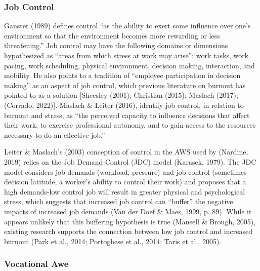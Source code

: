 \documentclass[
  twocolumn]{article}
\begin{document}
\subsubsection{Job Control}\label{job-control}

Ganster (1989) defines control ``as the ability to exert some influence
over one's environment so that the environment becomes more rewarding or
less threatening.'' Job control may have the following domains or
dimensions hypothesized as ``areas from which stress at work may
arise'': work tasks, work pacing, work scheduling, physical environment,
decision making, interaction, and mobility. He also points to a
tradition of ``employee participation in decision making'' as an aspect
of job control, which previous literature on burnout has pointed to as a
solution {[}Sheesley (2001); Christian (2015); Maslach (2017); (Corrado,
2022){]}. Maslach \& Leiter (2016), identify job control, in relation to
burnout and stress, as ``the perceived capacity to influence decisions
that affect their work, to exercise professional autonomy, and to gain
access to the resources necessary to do an effective job.''

Leiter \& Maslach's (2003) conception of control in the AWS used by
(Nardine, 2019) relies on the Job Demand-Control (JDC) model (Karasek,
1979). The JDC model considers job demands (workload, pressure) and job
control (sometimes decision latitude, a worker's ability to control
their work) and proposes that a high demands-low control job will result
in greater physical and psychological stress, which suggests that
increased job control can ``buffer'' the negative impacts of increased
job demands (Van der Doef \& Maes, 1999, p. 89). While it appears
unlikely that this buffering hypothesis is true (Mansell \& Brough,
2005), existing research supports the connection between low job control
and increased burnout (Park et al., 2014; Portoghese et al., 2014; Taris
et al., 2005).

\subsubsection{Vocational Awe}\label{vocational-awe}
\end{document}
